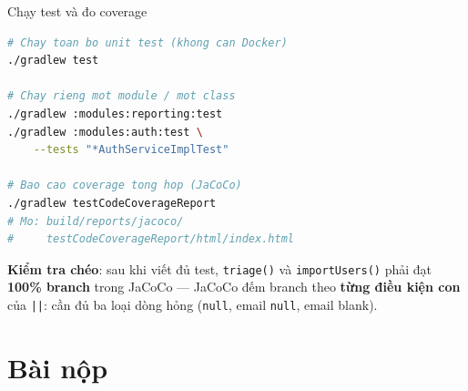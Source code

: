 \documentclass[aspectratio=169,12pt]{beamer}
\begin{document}
\begin{frame}[fragile]{Chạy test và đo coverage}
\begin{lstlisting}[language=bash,basicstyle=\ttfamily\footnotesize]
# Chay toan bo unit test (khong can Docker)
./gradlew test

# Chay rieng mot module / mot class
./gradlew :modules:reporting:test
./gradlew :modules:auth:test \
    --tests "*AuthServiceImplTest"

# Bao cao coverage tong hop (JaCoCo)
./gradlew testCodeCoverageReport
# Mo: build/reports/jacoco/
#     testCodeCoverageReport/html/index.html
\end{lstlisting}

  {\small \textbf{Kiểm tra chéo}: sau khi viết đủ test, \texttt{triage()} và
  \texttt{importUsers()} phải đạt \textbf{100\% branch} trong JaCoCo ---
  JaCoCo đếm branch theo \textbf{từng điều kiện con} của \texttt{||}: cần đủ
  ba loại dòng hỏng (\texttt{null}, email \texttt{null}, email blank).}
\end{frame}

\section{Bài nộp}
\end{document}
